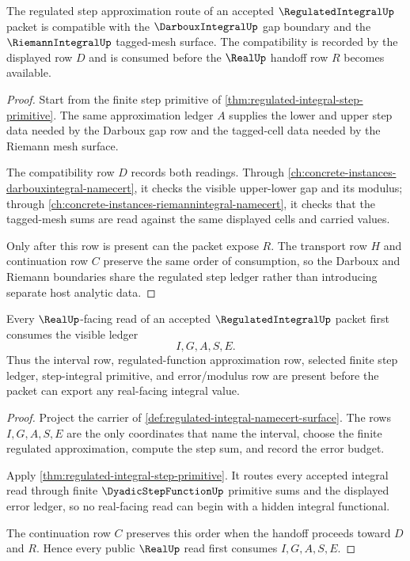 \begin{theorem}
\label{thm:regulated-integral-darboux-riemann-compatibility}
The regulated step approximation route of an accepted $\RegulatedIntegralUp$ packet is compatible with the $\DarbouxIntegralUp$ gap boundary and the $\RiemannIntegralUp$ tagged-mesh surface. The compatibility is recorded by the displayed row $D$ and is consumed before the $\RealUp$ handoff row $R$ becomes available.
\end{theorem}
\begin{proof}
Start from the finite step primitive of \autoref{thm:regulated-integral-step-primitive}. The same approximation ledger $A$ supplies the lower and upper step data needed by the Darboux gap row and the tagged-cell data needed by the Riemann mesh surface.

The compatibility row $D$ records both readings. Through \autoref{ch:concrete-instances-darbouxintegral-namecert}, it checks the visible upper-lower gap and its modulus; through \autoref{ch:concrete-instances-riemannintegral-namecert}, it checks that the tagged-mesh sums are read against the same displayed cells and carried values.

Only after this row is present can the packet expose $R$. The transport row $H$ and continuation row $C$ preserve the same order of consumption, so the Darboux and Riemann boundaries share the regulated step ledger rather than introducing separate host analytic data.
\end{proof}

\begin{theorem}
\label{thm:regulated-integral-visible-step-handoff}
Every $\RealUp$-facing read of an accepted $\RegulatedIntegralUp$ packet first consumes the visible ledger
$$
I,G,A,S,E .
$$
Thus the interval row, regulated-function approximation row, selected finite step ledger, step-integral primitive, and error/modulus row are present before the packet can export any real-facing integral value.
\end{theorem}
\begin{proof}
Project the carrier of \autoref{def:regulated-integral-namecert-surface}. The rows $I,G,A,S,E$ are the only coordinates that name the interval, choose the finite regulated approximation, compute the step sum, and record the error budget.

Apply \autoref{thm:regulated-integral-step-primitive}. It routes every accepted integral read through finite $\DyadicStepFunctionUp$ primitive sums and the displayed error ledger, so no real-facing read can begin with a hidden integral functional.

The continuation row $C$ preserves this order when the handoff proceeds toward $D$ and $R$. Hence every public $\RealUp$ read first consumes $I,G,A,S,E$.
\end{proof}

